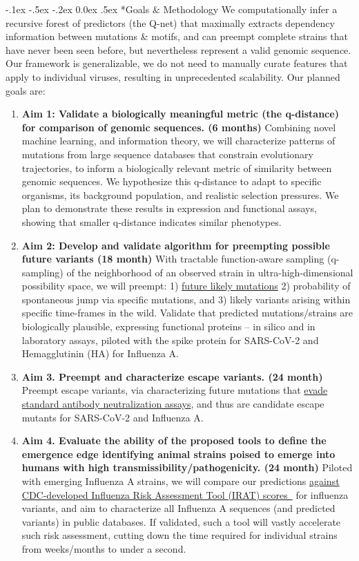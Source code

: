 \documentclass[onecolumn, compsoc,12pt]{IEEEtran}
\makeatletter
\renewcommand\paragraph{\@startsection {section}{1}{\z@}%
                                   {-.1ex \@plus -.5ex \@minus -.2ex}%
                                   {0.0ex \@plus.5ex}%
                                   {\fontsize{11}{10}\selectfont\bfseries\itshape\sffamily\color{black}}}
\def\hcov{SARS-CoV-2\xspace}
\def\infl{Influenza A\xspace}
\makeatother
\begin{document}
\paragraph*{Goals \& Methodology}
We computationally infer a recursive forest of predictors (the Q-net) that maximally extracts dependency information between mutations \& motifs, and can preempt complete strains that have never been seen before, but nevertheless represent a valid genomic sequence. Our framework is generalizable, we do not need to manually curate features that apply to individual viruses, resulting in unprecedented scalability. 
Our planned goals are: \begin{enumerate} 
[label=$\square$, leftmargin=0pt,
labelindent=0em, topsep=0.1em, labelsep=*, itemsep=.25em,itemindent=1em]

\item \textbf{Aim 1: Validate  a biologically meaningful metric (the q-distance) for comparison of genomic sequences. (6 months)}  Combining novel machine learning, and  information theory, we will  characterize  patterns of mutations from large sequence databases that constrain evolutionary trajectories, to inform a biologically relevant metric of similarity between genomic sequences.  We hypothesize   this q-distance  to   adapt to specific organisms, its background population, and realistic selection pressures. We plan to demonstrate these results in expression and functional assays, showing that smaller q-distance indicates similar phenotypes.
%
\item \textbf{Aim 2: Develop and validate  algorithm for preempting possible future variants (18 month) } With  tractable function-aware sampling (q-sampling) of the neighborhood of an observed strain in ultra-high-dimensional  possibility space, we will preempt: 1) \uline{future likely mutations} 2) probability of spontaneous jump  via specific mutations, and 3)  likely variants arising within specific time-frames in the wild. Validate  that predicted mutations/strains  are biologically plausible,  expressing functional proteins --  in silico and in laboratory assays, piloted with the spike protein for \hcov and Hemagglutinin (HA) for Influenza A. 
\item \textbf{Aim 3. Preempt and characterize escape variants. (24 month) } Preempt escape variants, via characterizing future mutations that  \uline{evade standard antibody neutralization assays}, and thus are candidate escape mutants for  \hcov and \infl.
\item \textbf{Aim 4. Evaluate the ability of the proposed tools to define the emergence edge identifying animal strains  poised to emerge into humans with high transmissibility/pathogenicity. (24 month)}  Piloted with emerging \infl strains, we will compare our predictions \uline{against CDC-developed Influenza Risk Assessment Tool (IRAT) scores~\cite{Influenz24:online}}  for influenza variants, and aim to characterize all Influenza A sequences (and predicted variants)  in public databases.  If validated, such a tool will vastly accelerate such risk assessment, cutting down the time required for individual strains from weeks/months to under a second.
\end{enumerate}
%
\end{document}
